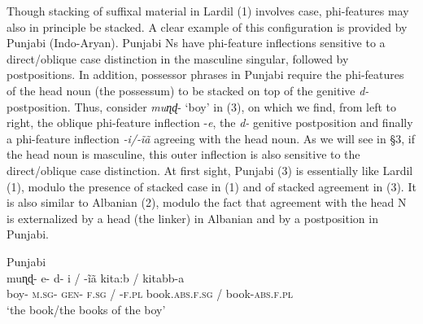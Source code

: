 \documentclass[output=paper]{langsci/langscibook}
\begin{document}
Though stacking of suffixal material in Lardil (1) involves case, phi-features may also in principle be stacked. A clear example of this configuration is provided by Punjabi (Indo-Aryan). Punjabi Ns have phi-feature inflections sensitive to a direct\slash oblique case distinction in the masculine singular, followed by postpositions. In addition, possessor phrases in Punjabi require the phi-features of the head noun (the possessum) to be stacked on top of the genitive \textit{d-} postposition. Thus, consider \textit{muɳɖ}{}- ‘boy’ in (3), on which we find, from left to right, the oblique phi-feature inflection -\textit{e}, the \textit{d-} genitive postposition and finally a phi-feature inflection \textit{{}-}\textit{i/-ĩã} agreeing with the head noun. As we will see in §3, if the head noun is masculine, this outer inflection is also sensitive to the direct\slash oblique case distinction. At first sight, Punjabi (3) is essentially like Lardil (1), modulo the presence of stacked case in (1) and of stacked agreement in (3). It is also similar to Albanian (2), modulo the fact that agreement with the head N is externalized by a head (the linker) in Albanian and by a postposition in Punjabi. 

\ea%
Punjabi \citep[316]{Manzini2015}\\
\gll muɳɖ- e-  d-  i / -ĩã    kita:b   /   kitabb-a\\
     boy- \textsc{m.sg-} \textsc{gen-}  \textsc{f.sg} / \textsc{-f.pl}  book.\textsc{abs.f.sg} /   book-\textsc{abs.f.pl}\\
\glt ‘the book/the books of the boy’
\z
\end{document}
